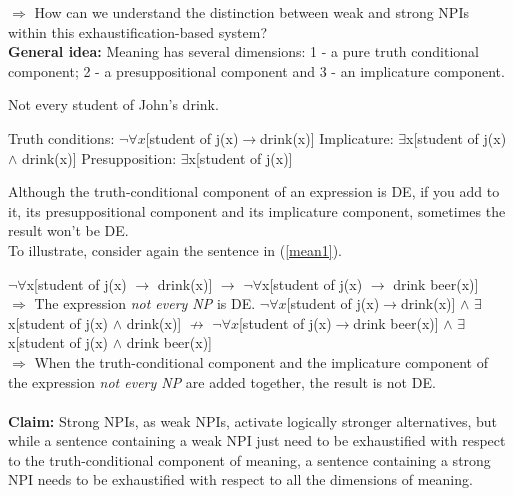 \documentclass[a4paper,11pt]{article}
\newcommand{\reff}[1]{(\ref{#1})}
\begin{document}
$\Rightarrow$ How can we understand the distinction between weak and strong NPIs within this exhaustification-based  system?
\\\textbf{General idea:} Meaning has several dimensions: 1 - a pure truth conditional component; 2 - a presuppositional component and 3 - an implicature component.
\begin{exe}
\ex\label{mean} \begin{xlist}
\ex\label{mean1} Not every student of John's drink.
\ex\label{mean2} \begin{xlist}
\ex\label{mean2a} Truth conditions: $\neg\forall x$[student of j(x)$\rightarrow$drink(x)]
\ex\label{mean2b} Implicature: $\exists$x[student of j(x) $\wedge$ drink(x)]
\ex\label{mean2c} Presupposition: $\exists$x[student of j(x)]
\end{xlist}
\end{xlist}
\end{exe}
Although the truth-conditional component of an expression is DE, if you add to it, its presuppositional component and its implicature component, sometimes the result won't be DE.
\\To illustrate, consider again the sentence in \reff{mean1}.
\begin{exe}
\ex\label{mean3} \begin{xlist}
\ex\label{mean3a} $\neg\forall$x[student of j(x) $\rightarrow$ drink(x)] $\rightarrow$ $\neg\forall$x[student of j(x) $\rightarrow$ drink beer(x)]
\\$\Rightarrow$ The expression \textit{not every NP} is DE.
\ex\label{mean3b} $\neg\forall x$[student of j(x)$\rightarrow$drink(x)] $\wedge$ $\exists$x[student of j(x) $\wedge$ drink(x)] $\nrightarrow$ $\neg\forall x$[student of j(x)$\rightarrow$drink beer(x)] $\wedge$ $\exists$x[student of j(x) $\wedge$ drink beer(x)]
\\$\Rightarrow$ When the truth-conditional component and the implicature component of the expression \textit{not every NP} are added together, the result is not DE.
\end{xlist}
\end{exe}
\paragraph{}
\textbf{Claim:} Strong NPIs, as weak NPIs, activate logically stronger alternatives, but while a sentence containing a weak NPI just need to be exhaustified with respect to the truth-conditional component of meaning, a sentence containing a strong NPI needs to be exhaustified with respect to all the dimensions of meaning.
\end{document}
